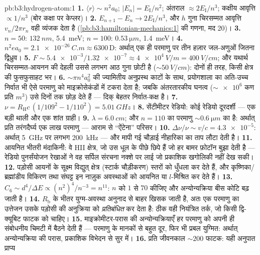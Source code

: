 \begin{solution}{pb:b3:hydrogen-atom:1}
\textbf{1.} $\langle r\rangle \sim n^2a_0$; $|E_n| =
E_{\text{I}}/n^2$; अंतराल $\approx 2E_{\text{I}}/n^3$; कक्षीय
आवृत्ति $\propto 1/n^3$ (बोर कक्षा पर केप्लर)।
\textbf{2.} $E_{n+1} - E_n \to 2E_{\text{I}}/n^3$, और $h$ गुना
चिरसम्मत आवृत्ति $v_n/2\pi r_n$ वही व्यंजक देता है
(\cref{pb:b3:hamiltonian-mechanics:1} की गणना, मद 20)।
\textbf{3.} $n = 50$: $\qty{132}{nm}$, \qty{5.4}{meV}; $n = 100$:
$\qty{0.53}{\micro m}$, \qty{1.4}{meV}।
\textbf{4.} $n^2ea_0 = \qty{2.1e-26}{C.m} \approx 6300\,\text{D}$:
अर्थात् एक ही परमाणु पर तीन हज़ार जल-अणुओं जितना द्विध्रुव।
\textbf{5.} $F \sim \num{5.4e-3}/\num{1.32e-7} \approx
\qty{4e4}{V/m} = \qty{400}{V/cm}$; और यथार्थ चिरसम्मत-आयनन की
देहली उससे लगभग आठ गुना छोटी है ($\sim\qty{50}{V/cm}$):
दोनों ही तरह, किसी क्षेत्र की फुसफुसाहट भर।
\textbf{6.} $\sim\pi n^4a_0^2$ की ज्यामितीय अनुप्रस्थ काटों के साथ,
प्रयोगशाला का अति-उच्च निर्वात भी ऐसे परमाणु को
माइक्रोसेकंडों में टकरा देता है; जबकि अंतरतारकीय घनत्व
($\sim\num{e6}$ कण प्रति $\unit{m^3}$) उसे दिनों तक छोड़ देते हैं ---
दिक् बेहतर निर्वात-कक्ष है।
\textbf{7.} $\nu = R_{\text{H}}c\,(1/109^2 - 1/110^2) =
\qty{5.01}{GHz}$।
\textbf{8.} सेंटीमीटर रेडियो: कोई रेडियो दूरदर्शी --- एक बड़ी थाली और
एक शांत ग्राही।
\textbf{9.} $\lambda = \qty{6.0}{cm}$; और $n = 110$ का परमाणु
$\sim\qty{0.6}{\micro m}$ का है: अर्थात् प्रति तरंगदैर्घ्य एक लाख
परमाणु --- आराम से ``ऐंटेना'' परिसर।
\textbf{10.} $\Delta\nu/\nu \sim v/c = \num{4.3e-5}$: अर्थात्
\qty{5}{GHz} पर लगभग \qty{200}{kHz} --- और मापी गई चौड़ाई
नीहारिका का ताप लौटा देती है।
\textbf{11.} आयनित भीतरी मंदाकिनी: वे HII क्षेत्र, जो उस धूल के पीछे
छिपे हैं जो हर बामर फ़ोटॉन बुझा देती है --- रेडियो पुनर्संयोजन
रेखाओं ने वह सर्पिल संरचना नक्शे पर लाई जो प्रकाशिक खगोलिकी नहीं देख सकी।
\textbf{12.} पड़ोसी आयनों के सूक्ष्म विद्युत् क्षेत्र (स्टार्क
चौड़ीकरण) स्तरों को धुँधला कर देते हैं, और कृष्णिका/ब्रह्मांडीय विकिरण
तथा संघट्ट इन नाज़ुक अवस्थाओं को आयनित या $l$-मिश्रित कर देते हैं।
\textbf{13.} $C_6 \sim d^4/\Delta E \propto (n^2)^4/n^{-3} =
n^{11}$: $n$ को $1$ से $70$ कीजिए और अन्योन्यक्रिया
बीस कोटि बढ़ जाती है।
\textbf{14.} $R_{\text{b}}$ के भीतर युग्म-अवस्था अनुनाद से बाहर
खिसक जाती है, अतः एक परमाणु का उत्तेजन उसके पड़ोसी की अनुक्रिया को
\emph{प्रतिबंधित} कर देता है: ठीक वही नियंत्रित तर्क, जो किसी
द्वि-क्यूबिट फाटक को चाहिए।
\textbf{15.} माइक्रोमीटर-परास की अन्योन्यक्रियाएँ हर परमाणु को अपनी
ही संबोधनीय चिमटी में बैठने देती हैं --- परमाणु के मानकों से बहुत दूर,
फिर भी प्रबल युग्मित: अर्थात् अन्योन्यक्रिया की परास, प्रकाशिक
विभेदन से सुर में।
\textbf{16.} प्रति जीवनकाल $\sim 200$ फाटक: यही अनुपात प्राप्य

\end{solution}
